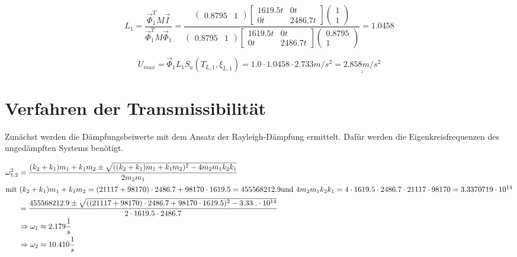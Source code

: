 \begin{equation*}
L_1 = \frac{\vec{\Phi}_1^T M \vec{I}}{\vec{\Phi}_1^T M \vec{\Phi}_1} = \frac{
\begin{pmatrix}
  0.8795 & 1
\end{pmatrix}
\begin{bmatrix}
  1619.5 t & 0 t\\
  0 t & 2486.7 t
\end{bmatrix}
\begin{pmatrix}
  1\\
  1
\end{pmatrix}
}{
\begin{pmatrix}
  0.8795 & 1
\end{pmatrix}
\begin{bmatrix}
  1619.5 t & 0 t\\
  0 t & 2486.7 t
\end{bmatrix}
\begin{pmatrix}
  0.8795 \\
  1
\end{pmatrix}}
= 1.0458
\end{equation*}

\begin{equation*}
\ddot U_{max} = \vec{\Phi}_1 L_1 S_a(T_{L,1}, \xi_{L,1}) = 1.0 \cdot 1.0458 \cdot 2.733 m/s^2 = \underline{\underline{2.858 m/s^2}}
\end{equation*}

\section{Verfahren der Transmissibilität}

Zunächst werden die Dämpfungsbeiwerte mit dem Ansatz der Rayleigh-Dämpfung ermittelt. Dafür werden die Eigenkreisfrequenzen des ungedämpften Systems benötigt.

\begin{align*}
\omega_{1,2}^2 &= \frac{(k_2 + k_1) m_1 + k_1 m_2 \pm \sqrt{((k_2 + k_1) m_1 + k_1 m_2)^2 - 4 m_2 m_1 k_2 k_1}}{2 m_2 m_1}\\
               \intertext{mit $(k_2 + k_1) m_1 + k_1 m_2 = (21117  + 98170 ) \cdot 2486.7  + 98170  \cdot 1619.5 = 455568212.9 $ \newline und $4 m_2 m_1 k_2 k_1 = 4 \cdot 1619.5  \cdot 2486.7  \cdot 21117  \cdot 98170 = 3.3370719 \cdot 10^{14}$}
               &= \frac{ 455568212.9 \pm \sqrt{((21117  + 98170 ) \cdot 2486.7  + 98170  \cdot 1619.5 )^2 - 3.33.. \cdot 10^{14}}}{2 \cdot 1619.5  \cdot 2486.7 }\\
               &\Rightarrow \omega_1 \approx 2.179 \frac{1}{s}\\
               &\Rightarrow \omega_2 \approx 10.410 \frac{1}{s}
\end{align*}

